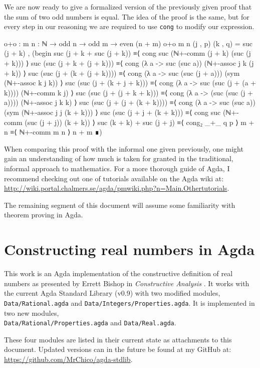 \documentclass[11pt,a4paper]{article}
\begin{document}
We are now ready to give a formalized version of the previously given proof that the sum of two odd numbers is equal. The idea of the proof is the same, but for every step in our reasoning we are required to use \texttt{cong} to modify our expression.
\begin{code}
o+o : {m n : ℕ} → odd n → odd m → even (n + m)
o+o {m} {n} (j , p) (k , q) = suc (j + k) , 
  (begin 
    suc (j + k + suc (j + k)) 
≡⟨ cong suc (ℕ+-comm (j + k) (suc (j + k)))  ⟩ 
    suc (suc (j + k + (j + k))) 
≡⟨ cong (λ a -> suc (suc a)) (ℕ+-assoc j k (j + k))  ⟩ 
    suc (suc (j + (k + (j + k)))) 
≡⟨ cong (λ a -> suc (suc (j + a))) (sym (ℕ+-assoc k j k))  ⟩ 
    suc (suc (j + (k + j + k))) 
≡⟨ cong (λ a -> suc (suc (j + (a + k)))) (ℕ+-comm k j)  ⟩
    suc (suc (j + (j + k + k))) 
≡⟨ cong (λ a -> (suc (suc (j + a)))) (ℕ+-assoc j k k)  ⟩ 
    suc (suc (j + (j + (k + k)))) 
≡⟨ cong (λ a -> suc (suc a)) (sym (ℕ+-assoc j j (k + k)))  ⟩ 
    suc (suc (j + j + (k + k))) 
≡⟨ cong suc (ℕ+-comm (suc (j + j)) (k + k)) ⟩ 
    suc (k + k) + suc (j + j) ≡⟨ cong₂ _+_  q p  ⟩ 
    m + n ≡⟨ ℕ+-comm m n  ⟩ 
    n + m
  ∎)
\end{code}
When comparing this proof with the informal one given previously, one might gain an understanding of how much is taken for granted in the traditional, informal approach to mathematics.
For a more thorough guide of Agda, I recommend checking out one of tutorials available on the Agda wiki at:\\
 \url{http://wiki.portal.chalmers.se/agda/pmwiki.php?n=Main.Othertutorials}. 

The remaining segment of this document will assume some familiarity with theorem proving in Agda.

\section{Constructing real numbers in Agda}\label{sec: reals in agda}
This work is an Agda implementation of the constructive definition of real numbers as presented by Errett Bishop in \textit{Constructive Analysis} \cite{bishop1985constructive}. It works with the current Agda Standard Library (v0.9) with two modified modules, \texttt{Data/Rational.agda} and \texttt{Data/Integers/Properties.agda}. It is implemented in two new modules, \\
\texttt{Data/Rational/Properties.agda} and \texttt{Data/Real.agda}.

These four modules are listed in their current state as attachments to this document. Updated versions can in the future be found at my GitHub at:  \url{https://github.com/MrChico/agda-stdlib}.
\end{document}
